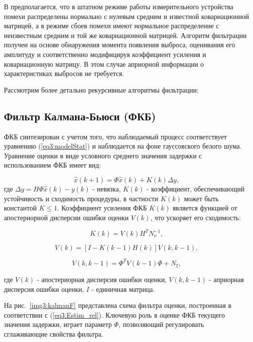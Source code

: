 В \cite{Klekis} предполагается, что в штатном режиме работы измерительного устройства помехи распределены нормально с нулевым средним и известной ковариационной матрицей, а в режиме сбоев помехи имеют нормальное распределение с неизвестным средним и той же ковариационной матрицей.
Алгоритм фильтрации получен на основе обнаружения момента появления выброса, оценивания его амплитуду и соответственно модифицируя коэффициент усиления и ковариационную матрицу. В этом случае априорной информации о характеристиках выбросов не требуется.  

Рассмотрим более детально рекурсивные алгоритмы фильтрации:


\subsection{Фильтр Калмана-Бьюси (ФКБ)}\label{FKB}
 ФКБ синтезирован с учетом того, что наблюдаемый процесс соответствует уравнению (\ref{eq3:modelStat}) и наблюдается на фоне гауссовского белого шума.
 Уравнение оценки в виде условного среднего значения задержки с использованием ФКБ имеет вид:


\begin{equation}\label{eq3:Estim_rel}
\hat{x}(k+1)=\Phi\hat{x}(k)+K(k)\Delta y,
\end{equation}
\noindent где $\Delta y=H\Phi\hat{x}(k)-y(k)$ - невязка, $K(k)$ - коэффициент, обеспечивающий устойчивость и сходимость процедуры, в частности $K(k)$ может быть константой $K\leq1$. Коэффициент усиления ФКБ $K(k)$ является функцией от апостериорной дисперсии ошибки оценки $V(k)$, что ускоряет его сходимость:

\begin{equation}\label{eq3:K}
K(k)=V(k)H^TN_{\nu}^{-1},
\end{equation}
 
\begin{equation}\label{eq3:V}
V(k)=[I-K(k-1)H(k)]V(k,k-1),
\end{equation}


\begin{equation}\label{eq3:Vkk-1}
V(k,k-1)=\Phi^TV(k-1)\Phi+N_\xi,
\end{equation}

\noindent где $V(k)$ - апостериорная дисперсия ошибки оценки, $V(k,k-1)$ - априорная дисперсия ошибки оценки, $I$ - единичная матрица.

На рис. \ref{img3:kalmanF} представлена схема фильтра оценки, построенная в соответствии с (\ref{eq3:Estim_rel}). Ключевую роль в оценке ФКБ текущего значения задержки, играет параметр $\Phi$, позволяющий регулировать сглаживающие свойства фильтра. 

